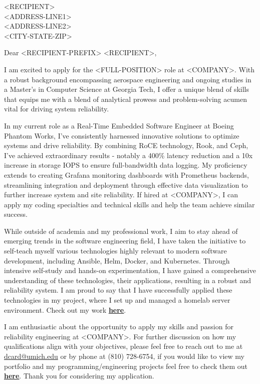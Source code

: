 \large
\bigskip\begin{minipage}[h]{\linewidth}
    \begin{raggedright}
        <RECIPIENT>\\
        <ADDRESS-LINE1>\\
        <ADDRESS-LINE2>\\
        <CITY-STATE-ZIP>\\
    \end{raggedright}
\end{minipage}

\bigskip Dear <RECIPIENT-PREFIX> <RECIPIENT>,

\medskip I am excited to apply for the <FULL-POSITION> role at <COMPANY>. With a robust background encompassing aerospace engineering and ongoing studies in a Master's in Computer Science at Georgia Tech, I offer a unique blend of skills that equips me with a blend of analytical prowess and problem-solving acumen vital for driving system reliability.

\medskip In my current role as a Real-Time Embedded Software Engineer at Boeing Phantom Works, I've consistently harnessed innovative solutions to optimize systems and drive reliability. By combining RoCE technology, Rook, and Ceph, I've achieved extraordinary results - notably a 400\% latency reduction and a 10x increase in storage IOPS to ensure full-bandwidth data logging. My proficiency extends to creating Grafana monitoring dashboards with Prometheus backends, streamlining integration and deployment through effective data visualization to further increase system and site reliability. If hired at <COMPANY>, I can apply my coding specialties and technical skills and help the team achieve similar success.

\medskip While outside of academia and my professional work, I aim to stay ahead of emerging trends in the software engineering field, I have taken the initiative to self-teach myself various technologies highly relevant to modern software development, including Ansible, Helm, Docker, and Kubernetes. Through intensive self-study and hands-on experimentation, I have gained a comprehensive understanding of these technologies, their applications, resulting in a robust and reliability system. I am proud to say that I have successfully applied these technologies in my project, where I set up and managed a homelab server environment. Check out my work \href{https://github.com/dancard32/homelab}{\textbf{\underline{here}}}.

\medskip I am enthusiastic about the opportunity to apply my skills and passion for reliability engineering at <COMPANY>. For further discussion on how my qualifications align with your objectives, please feel free to reach out to me at \href{mailto:dcard@umich.edu}{dcard@umich.edu} or by phone at (810) 728-6754, if you would like to view my portfolio and my programming/engineering projects feel free to check them out \href{https://dancard32.github.io/website/#/projects}{\textbf{\underline{here}}}. Thank you for considering my application.

